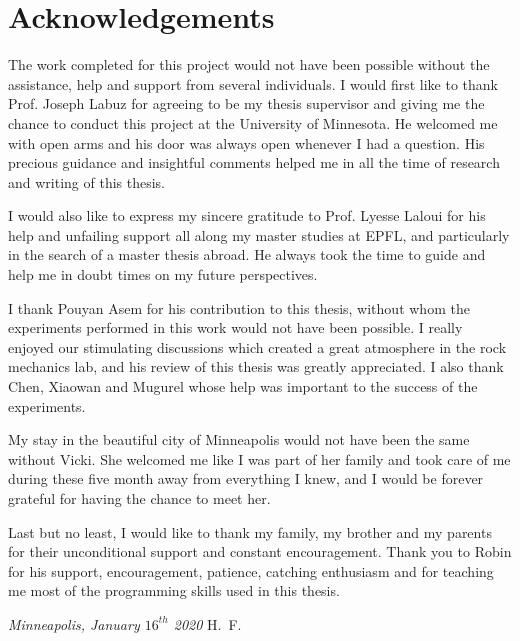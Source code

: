 \chapter*{Acknowledgements}
The work completed for this project would not have been possible without the assistance, help and support from several individuals. I would first like to thank Prof. Joseph Labuz for agreeing to be my thesis supervisor and giving me the chance to conduct this project at the University of Minnesota. He welcomed me with open arms and his door was always open whenever I had a question. His precious guidance and insightful comments helped me in all the time of research and writing of this thesis.  \newline

I would also like to express my sincere gratitude to Prof. Lyesse Laloui for his help and unfailing support all along my master studies at EPFL, and particularly in the search of a master thesis abroad. He always took the time to guide and help me in doubt times on my future perspectives.\newline

I thank Pouyan Asem for his contribution to this thesis, without whom the experiments performed in this work would not have been possible. I really enjoyed our stimulating discussions which created a great atmosphere in the rock mechanics lab, and his review of this thesis was greatly appreciated. I also thank Chen, Xiaowan and Mugurel whose help was important to the success of the experiments.\newline

My stay in the beautiful city of Minneapolis would not have been the same without Vicki. She welcomed me like I was part of her family and took care of me during these five month away from everything I knew, and I would be forever grateful for having the chance to meet her.\newline

Last but no least, I would like to thank my family, my brother and my parents for their unconditional support and  constant encouragement. Thank you to Robin for his support, encouragement, patience, catching enthusiasm and for teaching me most of the programming skills used in this thesis. 

\bigskip
 
\noindent\textit{Minneapolis, January $16^{th}$ 2020}
\hfill H.~F.
